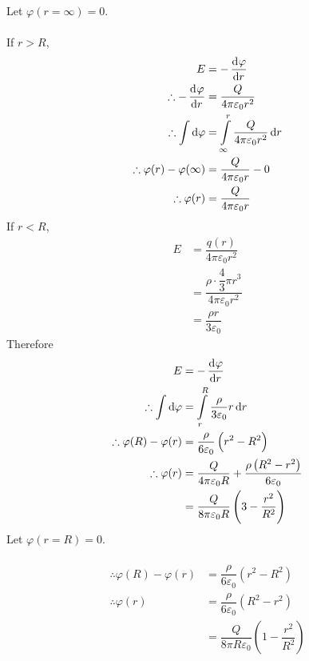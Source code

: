 \documentclass[fleqn, a4paper, 12pt, twoside]{article}
\theoremstyle{definition}
\theoremstyle{theorem}
\begin{document}
\begin{solution}
	\begin{tasks}
		\task
			Let $\varphi(r = \infty) = 0$.\\
			~\\
			If $r > R$,
			\begin{align*}
				E &= -\dod{\varphi}{r}\\
				\therefore -\dod{\varphi}{r} &= \dfrac{Q}{4 \pi \varepsilon_0 r^2}\\
				\therefore \int \dif \varphi &= \int\limits_{\infty}^{r} \dfrac{Q}{4 \pi \varepsilon_0 r^2} \dif r\\
				\therefore \varphi(r) - \varphi(\infty) &= \dfrac{Q}{4 \pi \varepsilon_0 r} - 0\\
				\therefore \varphi(r) &= \dfrac{Q}{4 \pi \varepsilon_0 r}
			\end{align*}
			If $r < R$,
			\begin{align*}
				E &= \dfrac{q(r)}{4 \pi \varepsilon_0 r^2}\\
				&= \dfrac{\rho \cdot \dfrac{4}{3} \pi r^3}{4 \pi \varepsilon_0 r^2}\\
				&= \dfrac{\rho r}{3 \varepsilon_0}
			\end{align*}
			Therefore
			\begin{align*}
				E &= -\dod{\varphi}{r}\\
				\therefore \int \dif \varphi &= \int\limits_{r}^{R} \dfrac{\rho}{3 \varepsilon_0} r \dif r\\
				\therefore \varphi(R) - \varphi(r) &= \dfrac{\rho}{6 \varepsilon_0} \left( r^2 - R^2 \right)\\
				\therefore \varphi(r) &= \dfrac{Q}{4 \pi \varepsilon_0 R} + \dfrac{\rho \left( R^2 - r^2 \right)}{6 \varepsilon_0}\\
				&= \dfrac{Q}{8 \pi \varepsilon_0 R} \left( 3 - \dfrac{r^2}{R^2} \right)
			\end{align*}
		\task
			Let $\varphi(r = R) = 0$.\\
			~\\
			\begin{align*}
				\therefore \varphi(R) - \varphi(r) &= \dfrac{\rho}{6 \varepsilon_0} \left( r^2 - R^2 \right)\\
				\therefore \varphi(r) &= \dfrac{\rho}{6 \varepsilon_0} \left( R^2 - r^2 \right)\\
				&= \dfrac{Q}{8 \pi R \varepsilon_0} \left( 1 - \dfrac{r^2}{R^2} \right)
			\end{align*}
	\end{tasks}
\end{solution}
\end{document}

